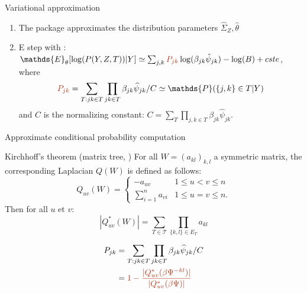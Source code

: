 \documentclass[11pt]{beamer}
\newcommand{\emphase}[1]{\textcolor{Complement}{#1}}
\begin{document}
\begin{frame}{Variational approximation}

 \begin{enumerate}
       \item The \emphase{{\selectfont{PLNmodels}}} package approximates the distribution parameters $\hat{\Sigma}_Z,  \hat{\theta}$ \vspace{0.5cm}
       \item E step with : $ \mathds{E}_\theta[\log(P(Y,Z,T))|Y] \simeq \sum_{j,k} \emphase{P_{jk}} \log(\beta_{jk}\hat{\psi}_{jk}) -\log(B) + cste $,\\
       where      
$$\emphase{P_{jk}} =  \sum_{T:jk\in T} \prod_{jk \in T} \beta_{jk} \widehat{\psi}_{jk}/C \simeq   \mathds{P}(\{j,k\}\in T |Y) $$
 and $C$ is the normalizing constant: $C = \sum_T \prod_{j, k \in T} \beta_{jk} \widehat{\psi}_{jk}$.\\
   \end{enumerate}
   

\end{frame}


\begin{frame}{Approximate conditional probability computation}
\footnotesize
\begin{exampleblock}{Kirchhoff's theorem (matrix tree, \cite{AiH89})}
For all $W=(a_{kl})_{k,l}$ a symmetric matrix, the corresponding Laplacian $Q(W)$ is defined as follows:
 \[Q_{uv}(W)=
 \begin{cases}
     -a_{uv} & 1\leq u<v \leq n\\
    \sum_{i=1}^n a_{vi} & 1\leq u=v \leq n.
\end{cases}
\]
Then for all $u$ et $v$:
    \[ |Q^*_{uv}(W)|=\sum_{T\in\mathcal{T}} \prod_{\{k,l\}\in E_T} a_{kl} \]
\end{exampleblock}
\begin{align*}
 P_{jk}&=\sum_{T:jk\in T} \prod_{jk \in T} \beta_{jk} \widehat{\psi}_{jk}/C\\
 &=\emphase{1- \frac{|Q^*_{uv}(\beta\Psi^{-kl})|}{|Q^*_{uv}(\beta\Psi)|}}
 \end{align*}
 
\end{frame}



\end{document}
